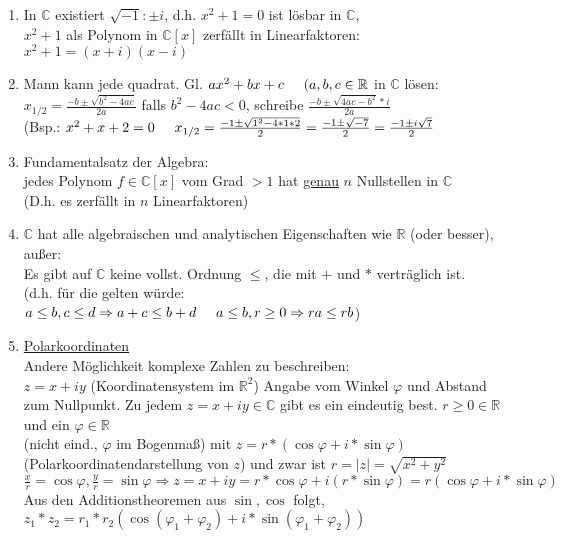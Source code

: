 \documentclass[a4paper,11pt]{article}
\newcommand{\hsp}{\hspace{5mm}}
\begin{document}
\begin{enumerate}[label=\arabic*)]
	\item In $\mathbb{C}$ existiert $\sqrt{-1}\colon\pm i$, d.h. $x^2+1=0$ ist lösbar in $\mathbb{C}$, \\
 	$x^2+1$ als Polynom in $\mathbb{C}[x]$ zerfällt in Linearfaktoren: \\
	$x^2+1=(x+i)(x-i)$
	\item Mann kann jede quadrat. Gl. $ax^2+bx+c\hsp(a,b,c\in\mathbb{R}$ in $\mathbb{C}$ lösen: \\
	$x_{1/2}=\frac{-b\pm\sqrt{b^2-4ac}}{2a}$ falls $b^2-4ac<0$, schreibe $\frac{-b\pm\sqrt{4ac-b^2}*i}{2a}$ \\
	(Bsp.: $x^2+x+2=0\hsp x_{1/2}=\frac{-1\pm\sqrt{1^2-4*1*2}}{2}=\frac{-1\pm\sqrt{-7}}{2}=\frac{-1\pm i\sqrt{7}}{2}$
	\item Fundamentalsatz der Algebra: \\
	jedes Polynom $f\in\mathbb{C}[x]$ vom Grad $>1$ hat \underline{genau} $n$ Nullstellen in $\mathbb{C}$ \\
	(D.h. es zerfällt in $n$ Linearfaktoren)
	\item $\mathbb{C}$ hat alle algebraischen und analytischen Eigenschaften wie $\mathbb{R}$ (oder besser), außer: \\
	Es gibt auf $\mathbb{C}$ keine vollst. Ordnung $\leq$,  die mit $+$ und $*$ verträglich ist. \\
	(d.h. für die gelten würde: $a\leq b, c\leq d\Rightarrow a+c\leq b+d\hsp a\leq b, r\geq 0\Rightarrow ra\leq rb$)
	\item \underline{Polarkoordinaten} \\
	Andere Möglichkeit komplexe Zahlen zu beschreiben:  \\
	$z=x+iy$ (Koordinatensystem im $\mathbb{R}^2$) Angabe vom Winkel $\varphi$ und Abstand zum Nullpunkt. Zu jedem $z=x+iy\in\mathbb{C}$ gibt es ein eindeutig best. $r\geq0\in\mathbb{R}$ und ein $\varphi\in\mathbb{R}$ \\
	(nicht eind., $\varphi$ im Bogenmaß) mit $z=r*(\cos\varphi+i*\sin\varphi)$ \\
	(Polarkoordinatendarstellung von $z$) und zwar ist $r=\vert z\vert=\sqrt{x^2+y^2}$ \\
	$\frac{x}{r}=\cos\varphi,\frac{y}{r}=\sin\varphi\Rightarrow z=x+iy=r*\cos\varphi+i(r*\sin\varphi)=r(\cos\varphi+i*\sin\varphi)$ \\
	Aus den Additionstheoremen aus $\sin,\cos$ folgt, $z_1*z_2=r_1*r_2(\cos(\varphi_1+\varphi_2)+i*\sin(\varphi_1+\varphi_2))$ \\

\end{enumerate}
\end{document}
